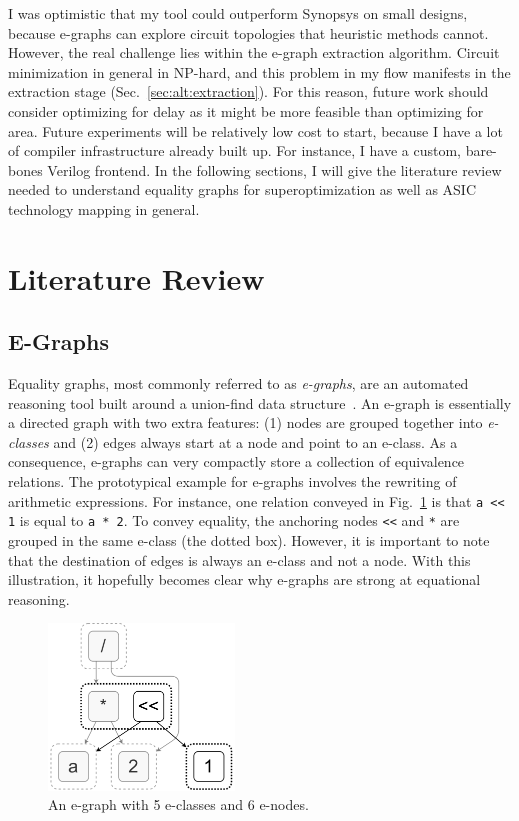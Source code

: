 \documentclass[10pt,letterpaper]{article}
\begin{document}
I was optimistic that my tool could outperform Synopsys on small designs,
because e-graphs can explore circuit topologies that heuristic methods cannot.
However, the real challenge lies within the e-graph extraction algorithm.
Circuit minimization in general in NP-hard, and this problem in my flow
manifests in the extraction stage (Sec.~\ref{sec:alt:extraction}). For this
reason, future work should consider optimizing for delay as it might be more
feasible than optimizing for area. Future experiments will be relatively low
cost to start, because I have a lot of compiler infrastructure already built
up. For instance, I have a custom, bare-bones Verilog frontend. In the
following sections, I will give the literature review needed to understand
equality graphs for superoptimization as well as ASIC technology mapping in
general.

\section{Literature Review}\label{sec:background}

\subsection{E-Graphs}\label{sec:background:egraph}

Equality graphs, most commonly referred to as \textit{e-graphs}, are an
automated reasoning tool built around a union-find data
structure~\cite{eggpaper}. An e-graph is essentially a directed graph with two
extra features: (1) nodes are grouped together into \textit{e-classes} and (2)
edges always start at a node and point to an e-class. As a consequence,
e-graphs can very compactly store a collection of equivalence relations. The
prototypical example for e-graphs involves the rewriting of arithmetic
expressions. For instance, one relation conveyed in Fig.~\ref{fig:egraph} is
that \texttt{a << 1} is equal to \texttt{a * 2}. To convey equality, the
anchoring nodes \texttt{<<} and \texttt{*} are grouped in the same e-class (the
dotted box). However, it is important to note that the destination of edges is
always an e-class and not a node. With this illustration, it hopefully becomes
clear why e-graphs are strong at equational reasoning.

\begin{figure}
    \centering
    \includegraphics[width=0.44\textwidth]{img/egraph.png}
    \caption{An e-graph with 5 e-classes and 6 e-nodes.}\label{fig:egraph}
\end{figure}
\end{document}
